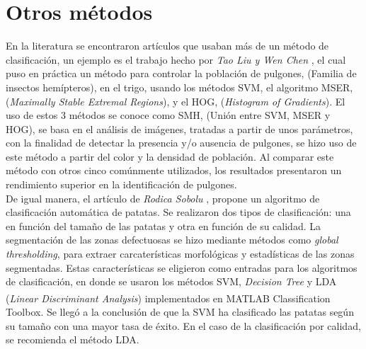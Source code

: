 \section{Otros métodos}
	En la literatura se encontraron artículos que usaban más de un método de clasificación, un ejemplo es el trabajo hecho por \textit{Tao Liu y Wen Chen} \cite{LIU201682}, el cual puso en práctica un método para controlar la población de pulgones, (Familia de insectos hemípteros), en el trigo, usando los métodos SVM, el algoritmo MSER, (\textit{Maximally Stable Extremal Regions}), y el HOG, (\textit{Histogram of Gradients}). El uso de estos 3 métodos se conoce como SMH, (Unión entre SVM, MSER y HOG), se basa en el análisis de imágenes, tratadas a partir de unos parámetros, con la finalidad de detectar la presencia y/o ausencia de pulgones, se hizo uso de este método a partir del color y la densidad de población. Al comparar este método con otros cinco comúnmente utilizados, los resultados presentaron un rendimiento superior en la identificación de pulgones. \\
	
	De igual manera, el artículo de \textit{Rodica Sobolu} \cite{sobolu2020automatic}, propone un algoritmo de clasificación automática de patatas. Se realizaron dos tipos de clasificación: una en función del tamaño de las patatas y otra en función de su calidad. La segmentación de las zonas defectuosas se hizo mediante métodos como \textit{global thresholding}, para extraer carcaterísticas morfológicas y estadísticas de las zonas segmentadas. Estas características se eligieron como entradas para los algoritmos de clasificación, en donde se usaron los métodos SVM, \textit{Decision  Tree} y LDA (\textit{Linear Discriminant Analysis}) implementados en MATLAB\textsuperscript{\textregistered} Classification Toolbox. Se llegó a la conclusión de que la SVM ha clasificado las patatas según su tamaño con una mayor tasa de éxito. En el caso de la clasificación por calidad, se recomienda el método LDA.\\
	
